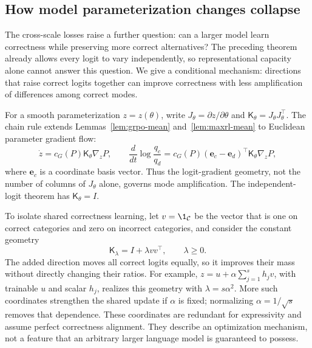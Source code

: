 \subsection{How model parameterization changes collapse}
\label{app:theory-size}

The cross-scale losses raise a further question: can a larger model learn
correctness while preserving more correct alternatives? The preceding theorem
already allows every logit to vary independently, so representational capacity
alone cannot answer this question. We give a conditional mechanism: directions
that raise correct logits together can improve correctness with less
amplification of differences among correct modes.

For a smooth parameterization $z=z(\theta)$, write
$J_\theta=\partial z/\partial\theta$ and
$\mathsf K_\theta=J_\theta J_\theta^\top$. The chain rule extends
Lemmas~\ref{lem:grpo-mean} and~\ref{lem:maxrl-mean} to Euclidean parameter
gradient flow:
\begin{equation}
 \dot z=c_G(P)\mathsf K_\theta\nabla_zP,
 \qquad
 \frac{d}{dt}\log\frac{q_c}{q_d}
 =c_G(P)(\mathbf e_c-\mathbf e_d)^\top\mathsf K_\theta\nabla_zP,
 \label{eq:parameterized-collapse}
\end{equation}
where $\mathbf e_c$ is a coordinate basis vector. Thus the logit-gradient geometry,
not the number of columns of $J_\theta$ alone, governs mode amplification.
The independent-logit theorem has $\mathsf K_\theta=I$.

To isolate shared correctness learning, let $v=\1_{\mathcal C}$ be the
vector that is one on correct categories and zero on incorrect categories,
and consider the constant geometry
\begin{equation}
 \mathsf K_\lambda=I+\lambda vv^\top,\qquad \lambda\ge0.
 \label{eq:shared-correctness-kernel}
\end{equation}
The added direction moves all correct logits equally, so it improves their
mass without directly changing their ratios. For example,
$z=u+\alpha\sum_{j=1}^s h_jv$, with trainable $u$ and scalar $h_j$, realizes
this geometry with $\lambda=s\alpha^2$. More such coordinates strengthen the
shared update if $\alpha$ is fixed; normalizing $\alpha=1/\sqrt{s}$ removes
that dependence. These coordinates are redundant for expressivity and assume
perfect correctness alignment. They describe an optimization mechanism, not
a feature that an arbitrary larger language model is guaranteed to possess.


